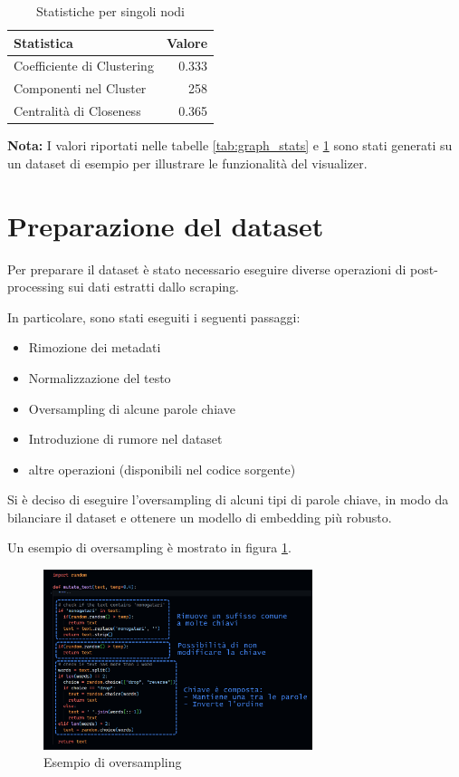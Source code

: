 \begin{table}[H]
      \centering
      \begin{tabularx}{\textwidth}{@{}l @{\extracolsep{\fill}} r@{}}
            \toprule
            Statistica                 & Valore \\
            \midrule
            Coefficiente di Clustering & 0.333  \\
            Componenti nel Cluster     & 258    \\
            Centralità di Closeness    & 0.365  \\
            \bottomrule
      \end{tabularx}
      \caption{Statistiche per singoli nodi}
      \label{tab:node_stats}
\end{table}

\noindent
\textbf{Nota:}
I valori riportati nelle tabelle \ref{tab:graph_stats} e
\ref{tab:node_stats} sono stati generati su un dataset di
esempio per illustrare le funzionalità del visualizer.

\section{Preparazione del dataset}
\label{sec:dataset_prep}
Per preparare il dataset è stato necessario eseguire
diverse operazioni di post-processing sui dati estratti
dallo scraping.

In particolare, sono stati eseguiti i seguenti passaggi:
\begin{itemize}
      \item Rimozione dei metadati
      \item Normalizzazione del testo
      \item Oversampling di alcune parole chiave
      \item Introduzione di rumore nel dataset
      \item altre operazioni (disponibili nel codice sorgente\cite{af64_spoiler_filter})
\end{itemize}

Si è deciso di eseguire l'oversampling di alcuni tipi di
parole chiave, in modo da bilanciare il dataset e ottenere
un modello di embedding più robusto.

Un esempio di oversampling è mostrato in figura
\ref{fig:oversampling}.

\begin{figure}[H]
      \centering
      \includegraphics[width=0.7\textwidth]{res/noise.png}
      \caption{Esempio di oversampling}
      \label{fig:oversampling}
\end{figure}

